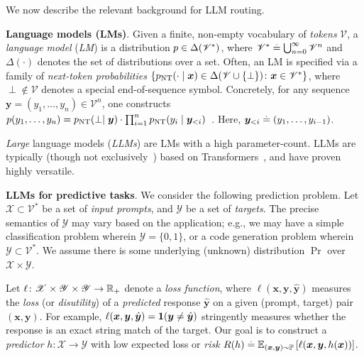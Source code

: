
We now describe the relevant background for LLM routing.

\textbf{Language models (LMs)}.
Given a finite, non-empty vocabulary of \emph{tokens} $\mathscr{V}$,
a \emph{language model} (\emph{LM})
is a distribution 
$p \in \Delta( \mathscr{V}^* )$,
where
$\mathscr{V}^* \stackrel{.}{=} \bigcup_{n = 0}^{\infty} \mathscr{V}^n$
and $\Delta( \cdot )$ denotes the set of distributions over a set.
Often, 
an LM is specified via a family of \emph{next-token probabilities}
$\{ p_{\rm NT}( \cdot \mid \boldsymbol{x} ) \in \Delta( \mathscr{V} \cup \{ \perp \} ) \colon \boldsymbol{x} \in \mathscr{V}^* \}$,
where $\perp \notin \mathscr{V}$ denotes a special end-of-sequence symbol.
Concretely, 
for any {sequence} $\boldsymbol{y} = ( y_1, \ldots, y_n ) \in \mathscr{V}^n$,
one constructs
$p( y_1, \ldots, y_n ) = p_{\rm NT}( \perp \mid \boldsymbol{y} ) \cdot \prod_{i = 1}^{n} p_{\rm NT}( y_{i} \mid \boldsymbol{y}_{< i} )$~\citep{Cotterell:2024}.
Here, $\boldsymbol{y}_{< i} \stackrel{.}{=} ( y_1, \ldots, y_{i - 1} )$.



\emph{Large} language models (\emph{LLMs})
are LMs
with a high parameter-count.
LLMs are typically (though not exclusively~\citep{Gu:2024b}) based on Transformers~\citep{Vaswani:2017},
and
have proven highly versatile.

\textbf{LLMs for predictive tasks}.
We consider the following prediction problem.
Let $\mathscr{X} \subset \mathscr{V}^*$ be a set of \emph{input prompts},
and $\mathscr{Y}$ be a set of \emph{targets}.
The precise semantics of $\mathscr{Y}$ may vary based on the application;
e.g., we may have 
a simple classification problem
wherein
$\mathscr{Y} = \{ 0, 1 \}$,
or 
a code generation problem wherein
$\mathscr{Y} \subset \mathscr{V}^*$.
We assume there is some underlying (unknown) distribution $\Pr$ over $\mathscr{X} \times \mathscr{Y}$.

Let
$\ell \colon \mathscr{X} \times \mathscr{Y} \times \mathscr{Y} \to \mathbb{R}_+$ denote a \emph{loss function},
where
$\ell( \boldsymbol{x}, \boldsymbol{y}, \hat{\boldsymbol{y}} )$
measures the \emph{loss} (or \emph{disutility}) of a \emph{predicted} response $\hat{\boldsymbol{y}}$ on a given (prompt, target) pair $( \boldsymbol{x}, \boldsymbol{y} )$.
For example, 
$\ell( \boldsymbol{x}, \boldsymbol{y}, \hat{\boldsymbol{y}} ) = \bm{1}( \boldsymbol{y} \neq \hat{\boldsymbol{y}} )$ stringently measures whether the response is an exact string match of the target.
Our goal is to construct a \emph{predictor}
$h \colon \mathscr{X} \to \mathscr{Y}$ with low expected loss or \emph{risk}
$R( h ) \stackrel{.}{=} \mathbb{E}_{( \boldsymbol{x}, \boldsymbol{y} ) \sim \mathbb{P}}\left[ \ell( \boldsymbol{x}, \boldsymbol{y}, h( \boldsymbol{x} ) ) \right]$.

